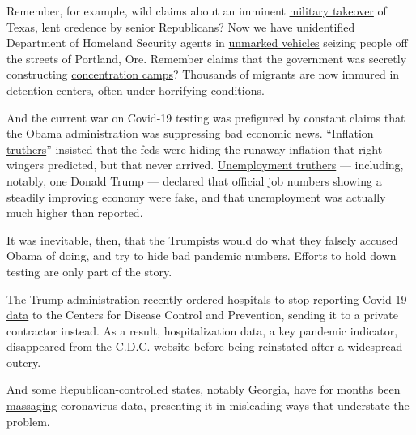 Remember, for example, wild claims about an imminent
\href{https://www.vox.com/2015/5/6/8559577/jade-helm-conspiracy}{military
takeover} of Texas, lent credence by senior Republicans? Now we have
unidentified Department of Homeland Security agents in
\href{https://www.npr.org/2020/07/17/892277592/federal-officers-use-unmarked-vehicles-to-grab-protesters-in-portland}{unmarked
vehicles} seizing people off the streets of Portland, Ore. Remember
claims that the government was secretly constructing
\href{https://www.splcenter.org/fighting-hate/intelligence-report/2010/fear-fema}{concentration
camps}? Thousands of migrants are now immured in
\href{https://www.nbcnews.com/politics/immigration/thousands-immigrants-suffer-solitary-confinement-u-s-detention-centers-n1007881}{detention
centers}, often under horrifying conditions.

And the current war on Covid-19 testing was prefigured by constant
claims that the Obama administration was suppressing bad economic news.
``\href{https://theweek.com/articles/444851/why-wont-inflation-conspiracy-theories-just-die-already}{Inflation
truthers}'' insisted that the feds were hiding the runaway inflation
that right-wingers predicted, but that never arrived.
\href{https://ritholtz.com/2016/02/donald-trump-and-other-republicans-are-unemployment-truthers/}{Unemployment
truthers} --- including, notably, one Donald Trump --- declared that
official job numbers showing a steadily improving economy were fake, and
that unemployment was actually much higher than reported.

It was inevitable, then, that the Trumpists would do what they falsely
accused Obama of doing, and try to hide bad pandemic numbers. Efforts to
hold down testing are only part of the story.

The Trump administration recently ordered hospitals to
\href{https://www.nytimes.com/2020/07/14/us/politics/trump-cdc-coronavirus.html}{stop
reporting}
\href{https://www.nytimes.com/2020/08/04/us/politics/coronavirus-trump-data-briefing.html}{Covid-19
data} to the Centers for Disease Control and Prevention, sending it to a
private contractor instead. As a result, hospitalization data, a key
pandemic indicator,
\href{https://www.washingtonpost.com/health/2020/07/16/coronavirus-hospitalization-data-outcry/}{disappeared}
from the C.D.C. website before being reinstated after a widespread
outcry.

And some Republican-controlled states, notably Georgia, have for months
been \href{https://t.co/qxtnHTyOKS?amp=1}{massaging} coronavirus data,
presenting it in misleading ways that understate the problem.

